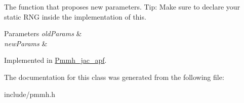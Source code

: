 The function that proposes new parameters. Tip\+: Make sure to declare your static R\+NG inside the implementation of this. 


\begin{DoxyParams}{Parameters}
{\em old\+Params} & \\
\hline
{\em new\+Params} & \\
\hline
\end{DoxyParams}


Implemented in \hyperlink{classPmmh__jac__apf_a863fc68aa67907e531c4da13afc74914}{Pmmh\+\_\+jac\+\_\+apf}.



The documentation for this class was generated from the following file\+:\begin{DoxyCompactItemize}
\item 
include/pmmh.\+h\end{DoxyCompactItemize}
